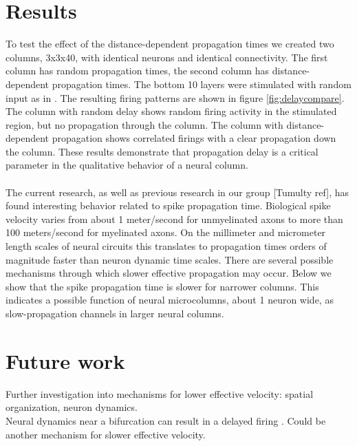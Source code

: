 \documentclass[a4paper,11pt]{article}
\begin{document}
\section{Results}
To test the effect of the distance-dependent propagation times we created two columns, 3x3x40,  with identical neurons and identical connectivity.
The first column has random propagation times, the second column has distance-dependent propagation times.
The bottom 10 layers were stimulated with random input as in \cite{izhikevich2003}.
The resulting firing patterns are shown in figure \ref{fig:delaycompare}.
\\
The column with random delay shows random firing activity in the stimulated region, but no propagation through the column.
The column with distance-dependent propagation shows correlated firings with a clear propagation down the column.
These results demonstrate that propagation delay is a critical parameter in the qualitative behavior of a neural column.
\\ \\
The current research, as well as previous research in our group [Tumulty ref], has found interesting behavior related to spike propagation time.
Biological spike velocity varies from about 1 meter/second for unmyelinated axons to  more than 100 meters/second for myelinated axons.
On the millimeter and micrometer length scales of neural circuits this translates to propagation times orders of magnitude faster than neuron dynamic time scales.
There are several possible mechanisms through which slower effective propagation may occur.
Below we show that the spike propagation time is slower for narrower columns. 
This indicates a possible function of neural microcolumns, about 1 neuron wide, as slow-propagation channels in larger neural columns.
\\
\section{Future work}
Further investigation into mechanisms for lower effective velocity: spatial organization, neuron dynamics.\\
Neural dynamics near a bifurcation can result in a delayed firing \cite{izhikevich}.
Could be another mechanism for slower effective velocity.
\end{document}
